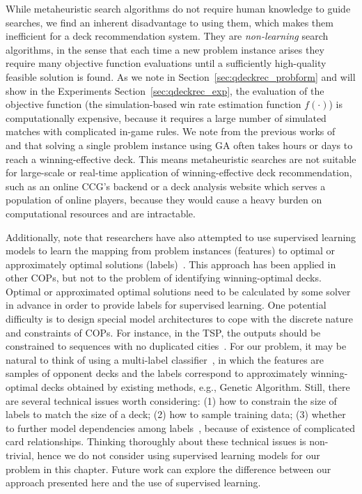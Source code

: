 While metaheuristic search algorithms do not require human knowledge to guide searches, we find an inherent disadvantage to using them, which makes them inefficient for a deck recommendation system. They are \textit{non-learning} search algorithms, in the sense that each time a new problem instance arises they require many objective function evaluations until a sufficiently high-quality feasible solution is found. As we note in Section~\ref{sec:qdeckrec_probform} and will show in the Experiments Section~\ref{sec:qdeckrec_exp}, the evaluation of the objective function (the simulation-based win rate estimation function $f(\cdot)$) is computationally expensive, because it requires a large number of simulated matches with complicated in-game rules. We note from the previous works of ~\textcite{garcia2016evolutionary} and \textcite{bjorke2017deckbuilding} that solving a single problem instance using GA often takes hours or days to reach a winning-effective deck. This means metaheuristic searches are not suitable for large-scale or real-time application of winning-effective deck recommendation, such as an online CCG's backend or a deck analysis website which serves a population of online players, because they would cause a heavy burden on computational resources and are intractable.


Additionally, note that researchers have also attempted to use supervised learning models to learn the mapping from problem instances (features) to optimal or approximately optimal solutions (labels)~\citep{vinyals2015pointer}. This approach has been applied in other COPs, but not to the problem of identifying winning-optimal decks. Optimal or approximated optimal solutions need to be calculated by some solver in advance in order to provide labels for supervised learning. One potential difficulty is to design special model architectures to cope with the discrete nature and constraints of COPs. For instance, in the TSP, the outputs should be constrained to sequences with no duplicated cities~\citep{vinyals2015pointer}. For our problem, it may be natural to think of using a multi-label classifier~\citep{tsoumakas2007multi}, in which the features are samples of opponent decks and the labels correspond to approximately winning-optimal decks obtained by existing methods, e.g., Genetic Algorithm. Still, there are several technical issues worth considering: (1) how to constrain the size of labels to match the size of a deck; (2) how to sample training data; (3) whether to further model dependencies among labels~\citep{zhang2010multi}, because of existence of complicated card relationships. Thinking thoroughly about these technical issues is non-trivial, hence we do not consider using supervised learning models for our problem in this chapter. Future work can explore the difference between our approach presented here and the use of supervised learning. 

